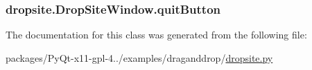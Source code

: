 \subsubsection[{quit\+Button}]{\setlength{\rightskip}{0pt plus 5cm}dropsite.\+Drop\+Site\+Window.\+quit\+Button}\label{classdropsite_1_1DropSiteWindow_a1494754da378ffc5cfbb8354a64c67b9}


The documentation for this class was generated from the following file\+:\begin{DoxyCompactItemize}
\item 
packages/\+Py\+Qt-\/x11-\/gpl-\/4../examples/draganddrop/\hyperlink{dropsite_8py}{dropsite.\+py}\end{DoxyCompactItemize}
